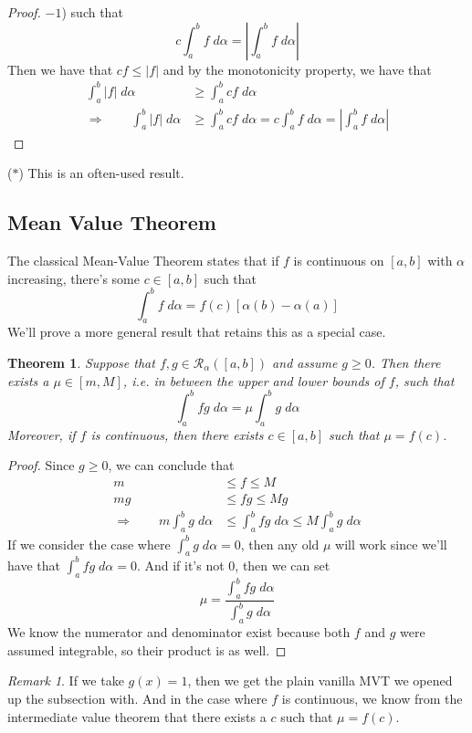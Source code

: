 \documentclass[12pt]{article}
\theoremstyle{plain}
\newtheorem{thm}{Theorem}[subsection]
\theoremstyle{definition}
\theoremstyle{remark}
\newtheorem*{rmk}{Remark}
\begin{document}
\begin{itemize}
\begin{proof}
            $-1$) such that 
                \[ c\int^b_a f\; d\alpha = \left\lvert 
                \int^b_a f\;d\alpha \right\rvert \]
            Then we have that $cf \leq |f|$ and by the monotonicity
            property, we have that
            \begin{align*}
                \int^b_a |f| \; d\alpha &\geq 
                    \int^b_a cf \; d\alpha \\
                \Rightarrow \qquad 
                \int^b_a |f| \; d\alpha &\geq
                    \int^b_a cf \; d\alpha =
                    c \int^b_a f \; d\alpha = 
                    \left\lvert
                    \int^b_a f \; d\alpha \right\rvert 
            \end{align*}
        \end{proof}
        ($*$) This is an often-used result.
        
\end{itemize}

\newpage
\subsection{Mean Value Theorem}

The classical Mean-Value Theorem states that if $f$ is continuous on $[a,b]$ with $\alpha$ increasing, there's some $c\in[a,b]$ such that 
    \[ \int^b_a f\;d\alpha = f(c)[\alpha(b)-\alpha(a)] \]
We'll prove a more general result that retains this as a special case.
\begin{thm}
\label{mvt}
Suppose that $f,g\in\mathscr{R}_\alpha([a,b])$ and assume $g\geq0$. Then there exists a $\mu\in[m,M]$, i.e. in between the upper and lower bounds of $f$, such that 
        \[ \int^b_a fg\;d\alpha = \mu \int^b_a g\;d\alpha \]
Moreover, if $f$ is continuous, then there exists $c\in[a,b]$ such that $\mu = f(c)$.
\end{thm}
\begin{proof}
Since $g\geq0$, we can conclude that 
\begin{align*}
    m &\leq f \leq M \\
    mg &\leq fg \leq Mg \\
    \Rightarrow \qquad m\int^b_a g\;d\alpha &\leq 
        \int^b_a fg\;d\alpha \leq  M \int^b_a g\;d\alpha
\end{align*}
If we consider the case where $\int^b_a g\;d\alpha= 0$, then any old $\mu$ will work since we'll have that $\int^b_a fg\;d\alpha=0$. And if it's not 0, then we can set 
\[ \mu = \frac{\int^b_a fg\;d\alpha}{\int^b_a g\;d\alpha} \]
We know the numerator and denominator exist because both $f$ and $g$ were assumed integrable, so their product is as well.
\end{proof}
\begin{rmk}
If we take $g(x)=1$, then we get the plain vanilla MVT we opened up the subsection with.  And in the case where $f$ is continuous, we know from the intermediate value theorem that there exists a $c$ such that $\mu=f(c)$. 
\end{rmk}
\end{document}
